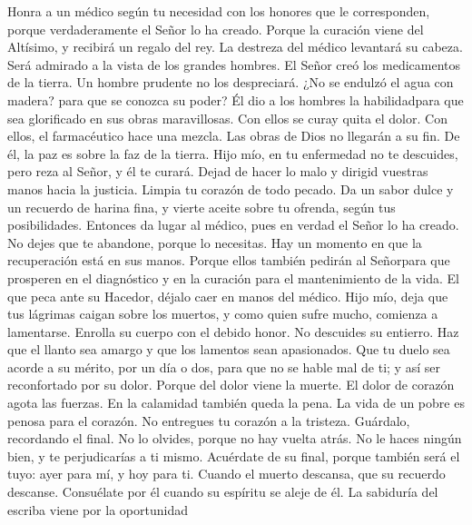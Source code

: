  Honra a un médico según tu necesidad con los honores que
le corresponden, porque verdaderamente el Señor lo ha creado.
 Porque la curación viene del Altísimo, y recibirá un
regalo del rey.  La destreza del médico levantará su
cabeza. Será admirado a la vista de los grandes hombres. 
El Señor creó los medicamentos de la tierra. Un hombre prudente no los
despreciará.  ¿No se endulzó el agua con madera? para que
se conozca su poder?  Él dio a los hombres la
habilidadpara que sea glorificado en sus obras maravillosas.
 Con ellos se curay quita el dolor.  Con
ellos, el farmacéutico hace una mezcla. Las obras de Dios no llegarán a
su fin. De él, la paz es sobre la faz de la tierra.  Hijo
mío, en tu enfermedad no te descuides, pero reza al Señor, y él te
curará.  Dejad de hacer lo malo y dirigid vuestras manos
hacia la justicia. Limpia tu corazón de todo pecado.  Da
un sabor dulce y un recuerdo de harina fina, y vierte aceite sobre tu
ofrenda, según tus posibilidades.  Entonces da lugar al
médico, pues en verdad el Señor lo ha creado. No dejes que te abandone,
porque lo necesitas.  Hay un momento en que la
recuperación está en sus manos.  Porque ellos también
pedirán al Señorpara que prosperen en el diagnóstico y en la curación
para el mantenimiento de la vida.  El que peca ante su
Hacedor, déjalo caer en manos del médico.  Hijo mío, deja
que tus lágrimas caigan sobre los muertos, y como quien sufre mucho,
comienza a lamentarse. Enrolla su cuerpo con el debido honor. No
descuides su entierro.  Haz que el llanto sea amargo y
que los lamentos sean apasionados. Que tu duelo sea acorde a su mérito,
por un día o dos, para que no se hable mal de ti; y así ser reconfortado
por su dolor.  Porque del dolor viene la muerte. El dolor
de corazón agota las fuerzas.  En la calamidad también
queda la pena. La vida de un pobre es penosa para el corazón.
 No entregues tu corazón a la tristeza. Guárdalo,
recordando el final.  No lo olvides, porque no hay vuelta
atrás. No le haces ningún bien, y te perjudicarías a ti mismo.
 Acuérdate de su final, porque también será el tuyo: ayer
para mí, y hoy para ti.  Cuando el muerto descansa, que
su recuerdo descanse. Consuélate por él cuando su espíritu se aleje de
él.  La sabiduría del escriba viene por la oportunidad
